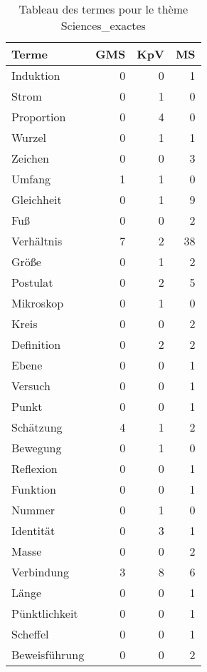 
\begin{table}[ht]
\centering
\caption{Tableau des termes pour le thème Sciences_exactes}
\label{tab:Sciences_exactes}
\begin{tabular}{lrrr}
\hline
 Terme         &   GMS &   KpV &   MS \\
\hline
 Induktion     &     0 &     0 &    1 \\
 Strom         &     0 &     1 &    0 \\
 Proportion    &     0 &     4 &    0 \\
 Wurzel        &     0 &     1 &    1 \\
 Zeichen       &     0 &     0 &    3 \\
 Umfang        &     1 &     1 &    0 \\
 Gleichheit    &     0 &     1 &    9 \\
 Fuß           &     0 &     0 &    2 \\
 Verhältnis    &     7 &     2 &   38 \\
 Größe         &     0 &     1 &    2 \\
 Postulat      &     0 &     2 &    5 \\
 Mikroskop     &     0 &     1 &    0 \\
 Kreis         &     0 &     0 &    2 \\
 Definition    &     0 &     2 &    2 \\
 Ebene         &     0 &     0 &    1 \\
 Versuch       &     0 &     0 &    1 \\
 Punkt         &     0 &     0 &    1 \\
 Schätzung     &     4 &     1 &    2 \\
 Bewegung      &     0 &     1 &    0 \\
 Reflexion     &     0 &     0 &    1 \\
 Funktion      &     0 &     0 &    1 \\
 Nummer        &     0 &     1 &    0 \\
 Identität     &     0 &     3 &    1 \\
 Masse         &     0 &     0 &    2 \\
 Verbindung    &     3 &     8 &    6 \\
 Länge         &     0 &     0 &    1 \\
 Pünktlichkeit &     0 &     0 &    1 \\
 Scheffel      &     0 &     0 &    1 \\
 Beweisführung &     0 &     0 &    2 \\

\end{tabular}
\end{table}
